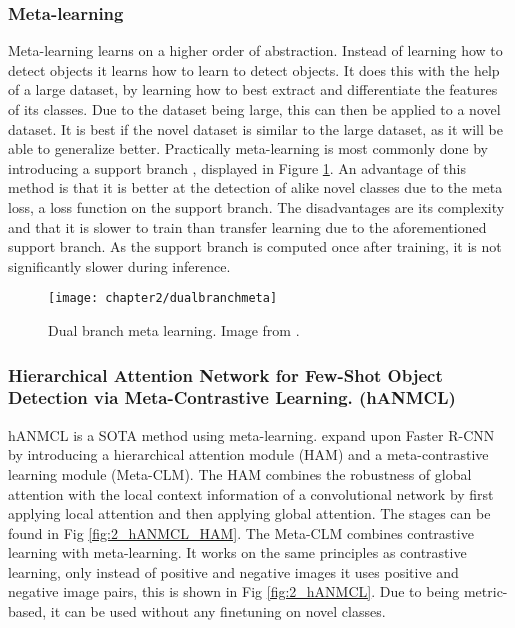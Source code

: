 \subsubsection{Meta-learning}

Meta-learning learns on a higher order of abstraction. Instead of learning how to detect objects it learns how to learn to detect objects. It does this with the help of a large dataset, by learning how to best extract and differentiate the features of its classes. Due to the dataset being large, this can then be applied to a novel dataset. It is best if the novel dataset is similar to the large dataset, as it will be able to generalize better. Practically meta-learning is most commonly done by introducing a support branch \cite{few-shot-comprehensive-survey}, displayed in Figure \ref{fig:2_dualbranchmeta}. An advantage of this method is that it is better at the detection of alike novel classes due to the meta loss, a loss function on the support branch. %
The disadvantages are its complexity and that it is slower to train than transfer learning due to the aforementioned support branch. As the support branch is computed once after training, it is not significantly slower during inference.

\begin{figure}[H]
	\centering
	\texttt{[image: chapter2/dualbranchmeta]}
	\caption{\label{fig:2_dualbranchmeta} Dual branch meta learning. Image from \citet{few-shot-comprehensive-survey}.}
\end{figure}

\subsubsection*{Hierarchical Attention Network for Few-Shot
Object Detection via Meta-Contrastive Learning. (hANMCL) \citet{hANMCL}}

hANMCL is a SOTA method using meta-learning. \citet{hANMCL} expand upon Faster R-CNN \citep{fasterrcnn} by introducing a  hierarchical attention module (HAM) and a meta-contrastive learning module (Meta-CLM). The HAM combines the robustness of global attention with the local context information of a convolutional network by first applying local attention and then applying global attention. The stages can be found in Fig \ref{fig:2_hANMCL_HAM}. The Meta-CLM combines contrastive learning with meta-learning. It works on the same principles as contrastive learning, only instead of positive and negative images it uses positive and negative image pairs, this is shown in Fig \ref{fig:2_hANMCL}. Due to being metric-based, it can be used without any finetuning on novel classes.

